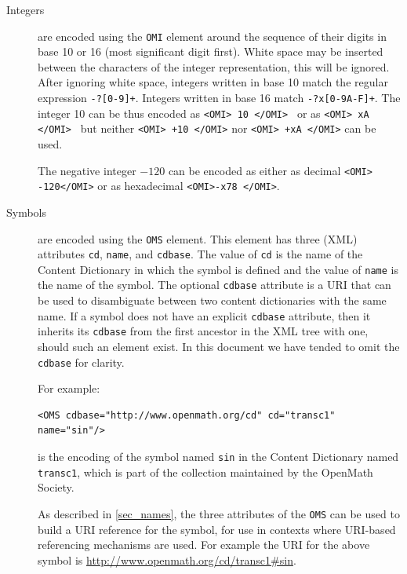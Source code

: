 \documentclass{report}
\def\OM{OpenMath\xspace}
\def\XML{XML\xspace}
\begin{document}
\begin{description}
\item[Integers] are encoded using the
\lstinline|OMI| element around the sequence of their
digits in base 10 or 16 (most significant digit first).  White space
may be inserted between the characters of the integer representation,
this will be ignored.  After ignoring white space, integers written in
base 10 match the regular expression
\lstinline|-?[0-9]+|.  Integers written in base 16 match
\lstinline|-?x[0-9A-F]+|.  The integer 10 can be thus
encoded as \lstinline|<OMI> 10 </OMI> | or as
\lstinline|<OMI> xA </OMI> | but neither
\lstinline|<OMI> +10 </OMI>| nor
\lstinline|<OMI> +xA </OMI>| can be used.


The negative integer $-120$ can be encoded
as either as decimal \lstinline|<OMI> -120</OMI>| or as hexadecimal 
\lstinline|<OMI>-x78 </OMI>|.
\item[Symbols] are encoded using the \lstinline|OMS| element. This element has three
  (\XML) attributes \lstinline|cd|, \lstinline|name|, and \lstinline|cdbase|. The value
  of \lstinline|cd| is the name of the Content Dictionary in which the symbol is defined
  and the value of \lstinline|name| is the name of the symbol.  The optional
  \lstinline|cdbase| attribute is a URI that can be used to disambiguate between two
  content dictionaries with the same name.  If a symbol does not have an explicit
  \lstinline|cdbase| attribute, then it inherits its \lstinline|cdbase| from the first
  ancestor in the \XML tree with one, should such an element exist.  In this document we
  have tended to omit the \lstinline|cdbase| for clarity.
  
For example:
\begin{lstlisting}
<OMS cdbase="http://www.openmath.org/cd" cd="transc1" name="sin"/>
\end{lstlisting}
is the encoding of the symbol named \lstinline|sin| in the Content Dictionary named
\lstinline|transc1|, which is part of the collection maintained by the \OM Society.


As described in \ref{sec_names}, the three attributes of the \lstinline|OMS| can be used
to build a URI reference for the symbol, for use in contexts where URI-based referencing
mechanisms are used.  For example the URI for the above symbol is
\url{http://www.openmath.org/cd/transc1\#sin}.


\end{description}
\end{document}

